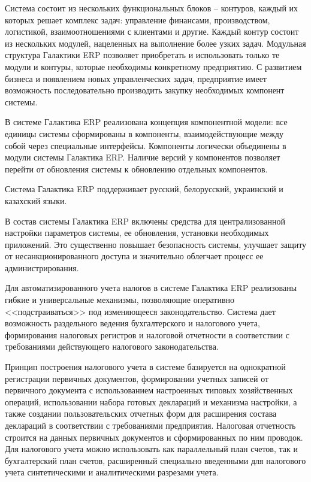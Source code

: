 \documentclass[14pt,a4paper]{reportmod}
\begin{document}
Система состоит из нескольких функциональных блоков – контуров, каждый их которых решает комплекс задач: управление финансами, производством, логистикой, взаимоотношениями с клиентами и другие. Каждый контур состоит из нескольких модулей, нацеленных на выполнение более узких задач. Модульная структура Галактики ERP позволяет приобретать и использовать только те модули и контуры, которые необходимы конкретному предприятию. С развитием бизнеса и появлением новых управленческих задач, предприятие имеет возможность последовательно производить закупку необходимых компонент системы.


В системе Галактика ERP реализована концепция компонентной модели: все единицы системы сформированы в компоненты, взаимодействующие между собой через специальные интерфейсы. Компоненты логически объединены в модули системы Галактика ERP. Наличие версий у компонентов позволяет перейти от обновления системы к обновлению отдельных компонентов.


Система Галактика ERP поддерживает русский, белорусский, украинский и казахский языки.


В состав системы Галактика ERP включены средства для централизованной настройки параметров системы, ее обновления, установки необходимых приложений. Это существенно повышает безопасность системы, улучшает защиту от несанкционированного доступа и значительно облегчает процесс ее администрирования.


Для автоматизированного учета налогов в системе Галактика ERP реализованы гибкие и универсальные механизмы, позволяющие оперативно <<подстраиваться>> под изменяющееся законодательство. Система дает возможность раздельного ведения бухгалтерского и налогового учета, формирования налоговых регистров и налоговой отчетности в соответствии с требованиями действующего налогового законодательства.


Принцип построения налогового учета в системе базируется на однократной регистрации первичных документов, формировании учетных записей от первичного документа с использованием настроенных типовых хозяйственных операций, использовании набора готовых деклараций и механизма настройки, а также создании пользовательских отчетных форм для расширения состава деклараций в соответствии с требованиями предприятия. Налоговая отчетность строится на данных первичных документов и сформированных по ним проводок. Для налогового учета можно использовать как параллельный план счетов, так и бухгалтерский план счетов, расширенный специально введенными для налогового учета синтетическими и аналитическими разрезами учета.
\end{document}
